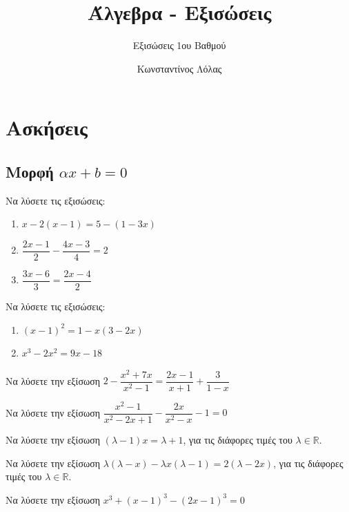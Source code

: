\documentclass{presentation}
\title{Άλγεβρα - Εξισώσεις}
\subtitle{Εξισώσεις 1ου Βαθμού}
\author[Λόλας]{Κωνσταντίνος Λόλας }
\begin{document}
\begin{frame}
  \titlepage
\end{frame}

\section{Ασκήσεις}

\exercises

\subsection{Μορφή $αx+b=0$}

\begin{askisi}
  Να λύσετε τις εξισώσεις:
  \begin{enumerate}[<+->]
    \item $x-2(x-1)=5-(1-3x)$
    \item $\dfrac{2x-1}{2}-\dfrac{4x-3}{4}=2$
    \item $\dfrac{3x-6}{3}= \dfrac{2x-4}{2}$
  \end{enumerate}
\end{askisi}

\begin{askisi}
  Να λύσετε τις εξισώσεις:
  \begin{enumerate}[<+->]
    \item $(x-1)^2=1-x(3-2x)$
    \item $x^3-2x^2=9x-18$
  \end{enumerate}
\end{askisi}

\begin{askisi}
  Να λύσετε την εξίσωση $2-\dfrac{x^2+7x}{x^2-1}= \dfrac{2x-1}{x+1}+\dfrac{3}{1-x}$
\end{askisi}

\begin{askisi}
  Να λύσετε την εξίσωση $\dfrac{x^2-1}{x^2-2x+1}-\dfrac{2x}{x^2-x}-1=0$
\end{askisi}

\begin{askisi}
  Να λύσετε την εξίσωση $(λ-1)x=λ+1$, για τις διάφορες τιμές του $λ\in\mathbb{R}$.
\end{askisi}

\begin{askisi}
  Να λύσετε την εξίσωση $λ(λ-x)-λx(λ-1)=2(λ-2x)$, για τις διάφορες τιμές του $λ\in\mathbb{R}$.
\end{askisi}

\begin{askisi}
  Να λύσετε την εξίσωση $x^3+(x-1)^3-(2x-1)^3=0$
\end{askisi}
\end{document}
